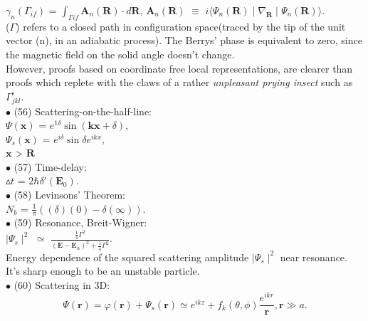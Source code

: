 \documentclass[a4paper, 10pt, onepage]{elegantbook}
\begin{document}
{$\gamma_n(\Gamma_{if})$ = $\int_{\Gamma if} \mathbf A_n(\mathbf R) \cdot  d{\mathbf R}$, $ \mathbf A_n(\mathbf R)$ $\equiv$ $ i \langle \Psi_n(\mathbf R) \mid \nabla_{\mathbf R} \mid \Psi_n(\mathbf R) \rangle$. \\

($\Gamma$) refers to a closed path in configuration space(traced by the tip of the unit vector (n), in an adiabatic process). The Berrys' phase is equivalent to zero, since the magnetic field on the solid angle doesn't change.  \\

However, proofs based on coordinate free local representations, are clearer than proofs which replete with the claws of a rather \emph{unpleasant prying insect} such as $\Gamma^i_{jkl}$. \\

$\bullet$ (56) Scattering-on-the-half-line:  \\

$\Psi(\mathbf x)$ = $e^{1 \delta} \sin(\mathbf {kx} + \delta)$,  \\   

$\Psi_s(\mathbf x)$ = $e^{i \delta} \sin \delta e^{ikx}$,  \\  

$\mathbf x$ > $ \mathbf R$  \\

$\bullet$ (57) Time-delay:  \\  

$\vartriangle t$ = $2\hbar \delta'( \mathbf E_0)$.  \\


$\bullet$ (58) Levinsons' Theorem:  \\  

$\mathit N_b$ = $\frac{1}{\pi} ((\delta)(0) - \delta(\infty))$.  \\


$\bullet$ (59) Resonance, Breit-Wigner:  \\  

$\mid \Psi_s \mid^2$ $\simeq$ $\frac{ \frac{1}{4} \Gamma^2} {(\mathbf E - \mathbf E_\alpha)^2 + \frac{1}{4} \Gamma^2}$.  \\

Energy dependence of the squared scattering amplitude $ \mid \Psi_s \mid^2$ near resonance. It's sharp enough to be an unstable particle. \\

$\bullet$ (60) Scattering in 3D:  \\  
\begin{equation}
\Psi(\mathbf r) = \varphi(\mathbf r) + \Psi_s(\mathbf r) \simeq e^{ikz} + f_k(\theta, \phi) \frac{e^{ikr}}{\mathbf r}, \mathbf r \gg a.
\end{equation}

}
\end{document}
